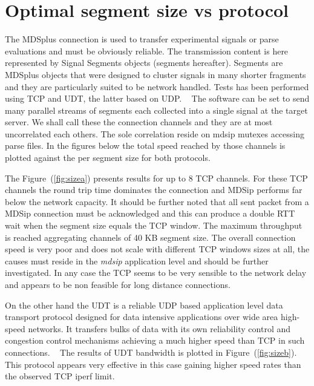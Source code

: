 \documentclass[10pt,a4paper]{article}
\begin{document}
\section{ Optimal segment size vs protocol }

The MDSplus connection is used to transfer experimental signals or parse evaluations and must be obviously reliable.
The transmission content is here represented by Signal Segments objects (segments hereafter). 
Segments are MDSplus objects that were designed to cluster signals in many shorter fragments and they are particularly suited to be network handled.
Tests has been performed using TCP and UDT, the latter based on UDP. 
~
The software can be set to send many parallel streams of segments each collected into a single signal at the target server.
We shall call these the connection channels and they are at most uncorrelated each others. The sole correlation reside on mdsip mutexes accessing parse files.
In the figures below the total speed reached by those channels is plotted against the per segment size for both protocols.

The Figure~(\ref{fig:sizea}) presents results for up to 8 TCP channels. 
For these TCP channels the round trip time dominates the connection and MDSip performs far below the network capacity.
It should be further noted that all sent packet from a MDSip connection must be acknowledged and this can produce a double RTT wait when the segment size equals the TCP window.
The maximum throughput is reached aggregating channels of 40 KB segment size.
The overall connection speed is very poor and does not scale with different TCP windows sizes at all, the causes must reside in the \emph{mdsip} application level and should be further investigated.
In any case the TCP seems to be very sensible to the network delay and appears to be non feasible for long distance connections.

On the other hand the UDT is a reliable UDP based application level data transport protocol designed for data intensive applications over wide area high-speed networks. 
It transfers bulks of data with its own reliability control and congestion control mechanisms achieving a much higher speed than TCP in such connections.
~
The results of UDT bandwidth is plotted in Figure~(\ref{fig:sizeb}).
This protocol appears very effective in this case gaining higher speed rates than the observed TCP iperf limit.
\end{document}
